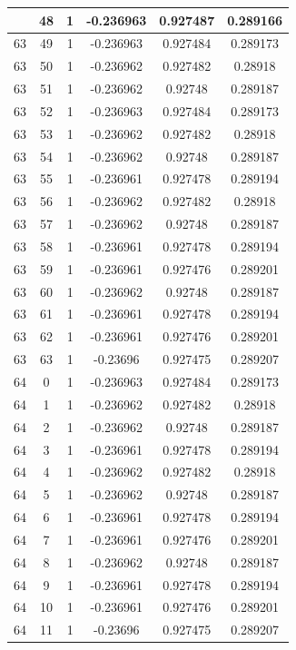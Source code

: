 \documentclass[12pt,a4paper]{article}
\numberwithin{equation}{section}
\numberwithin{figure}{section}
\numberwithin{table}{section}
\begin{document}
\begin{longtable}{|c|c|c|c|c|c|}
\pagebreak
63 & 48 & 1 & -0.236963 & 0.927487 & 0.289166 \\ \hline
63 & 49 & 1 & -0.236963 & 0.927484 & 0.289173 \\ \hline
63 & 50 & 1 & -0.236962 & 0.927482 & 0.28918 \\ \hline
63 & 51 & 1 & -0.236962 & 0.92748 & 0.289187 \\ \hline
63 & 52 & 1 & -0.236963 & 0.927484 & 0.289173 \\ \hline
63 & 53 & 1 & -0.236962 & 0.927482 & 0.28918 \\ \hline
63 & 54 & 1 & -0.236962 & 0.92748 & 0.289187 \\ \hline
63 & 55 & 1 & -0.236961 & 0.927478 & 0.289194 \\ \hline
63 & 56 & 1 & -0.236962 & 0.927482 & 0.28918 \\ \hline
63 & 57 & 1 & -0.236962 & 0.92748 & 0.289187 \\ \hline
63 & 58 & 1 & -0.236961 & 0.927478 & 0.289194 \\ \hline
63 & 59 & 1 & -0.236961 & 0.927476 & 0.289201 \\ \hline
63 & 60 & 1 & -0.236962 & 0.92748 & 0.289187 \\ \hline
63 & 61 & 1 & -0.236961 & 0.927478 & 0.289194 \\ \hline
63 & 62 & 1 & -0.236961 & 0.927476 & 0.289201 \\ \hline
63 & 63 & 1 & -0.23696 & 0.927475 & 0.289207 \\ \hline
64 & 0 & 1 & -0.236963 & 0.927484 & 0.289173 \\ \hline
64 & 1 & 1 & -0.236962 & 0.927482 & 0.28918 \\ \hline
64 & 2 & 1 & -0.236962 & 0.92748 & 0.289187 \\ \hline
64 & 3 & 1 & -0.236961 & 0.927478 & 0.289194 \\ \hline
64 & 4 & 1 & -0.236962 & 0.927482 & 0.28918 \\ \hline
64 & 5 & 1 & -0.236962 & 0.92748 & 0.289187 \\ \hline
64 & 6 & 1 & -0.236961 & 0.927478 & 0.289194 \\ \hline
64 & 7 & 1 & -0.236961 & 0.927476 & 0.289201 \\ \hline
64 & 8 & 1 & -0.236962 & 0.92748 & 0.289187 \\ \hline
64 & 9 & 1 & -0.236961 & 0.927478 & 0.289194 \\ \hline
64 & 10 & 1 & -0.236961 & 0.927476 & 0.289201 \\ \hline
64 & 11 & 1 & -0.23696 & 0.927475 & 0.289207 \\ \hline

\end{longtable}
\end{document}
